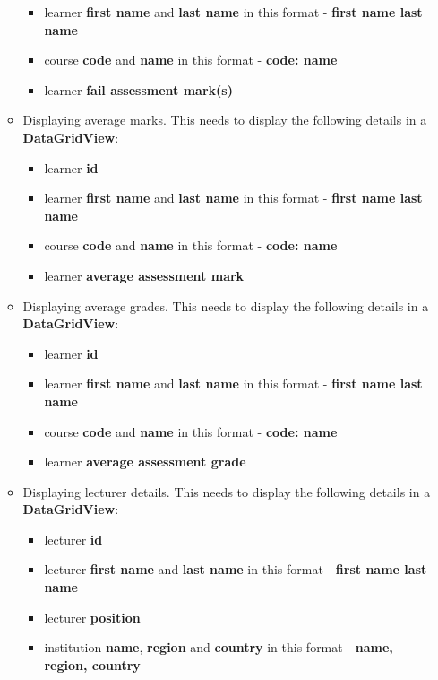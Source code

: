 \documentclass{article}
\begin{document}
\begin{itemize}
\begin{itemize}
\begin{itemize}
            \item learner \textbf{first name} and \textbf{last name} in this format - \textbf{first name last name}
            \item course \textbf{code} and \textbf{name} in this format - \textbf{code: name}
            \item learner \textbf{fail assessment mark(s)}
        \end{itemize}
        \item Displaying average marks. This needs to display the following details in a \textbf{DataGridView}:
        \begin{itemize}
            \item learner \textbf{id}
            \item learner \textbf{first name} and \textbf{last name} in this format - \textbf{first name last name}
            \item course \textbf{code} and \textbf{name} in this format - \textbf{code: name}
            \item learner \textbf{average assessment mark}
        \end{itemize}
        \item Displaying average grades. This needs to display the following details in a \textbf{DataGridView}:
        \begin{itemize}
            \item learner \textbf{id}
            \item learner \textbf{first name} and \textbf{last name} in this format - \textbf{first name last name}
            \item course \textbf{code} and \textbf{name} in this format - \textbf{code: name}
            \item learner \textbf{average assessment grade}
        \end{itemize}
        \item Displaying lecturer details. This needs to display the following details in a \textbf{DataGridView}:
        \begin{itemize}
            \item lecturer \textbf{id}
            \item lecturer \textbf{first name} and \textbf{last name} in this format - \textbf{first name last name}
            \item lecturer \textbf{position}
            \item institution \textbf{name}, \textbf{region} and \textbf{country} in this format - \textbf{name, region, country}

\end{itemize}
\end{itemize}
\end{itemize}
\end{document}

